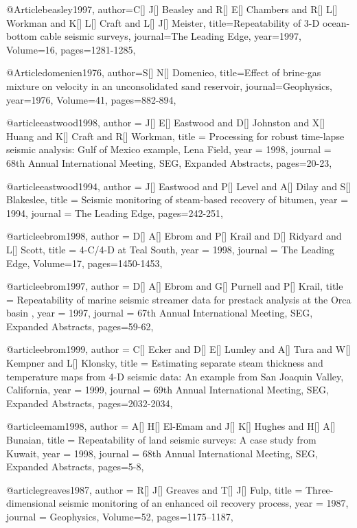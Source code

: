 @Article{beasley1997,
  author={C[] J[] Beasley and R[] E[] Chambers and R[] L[] Workman and K[] L[] Craft and L[] J[] Meister},
  title={Repeatability of 3-D ocean-bottom cable seismic
surveys},
  journal={The Leading Edge},
  year=1997,
  Volume=16,
  pages={1281-1285},
}


@Article{domenien1976,
  author={S[] N[] Domenieo},
  title={Effect of brine-gas mixture on velocity in an
unconsolidated sand reservoir},
  journal={Geophysics},
  year=1976,
  Volume=41,
  pages={882-894},
}

@article{eastwood1998,
  author =	 {J[] E[] Eastwood and D[] Johnston and X[] Huang and K[] Craft and R[] Workman},
  title =	 { Processing for robust time-lapse seismic analysis: Gulf of
Mexico example, Lena Field},
  year =	 1998,
  journal =	 {68th Annual International Meeting, SEG, Expanded Abstracts},
 pages=20-23,
}


@article{eastwood1994,
  author =	 {J[] Eastwood and P[] Level and A[] Dilay and S[] Blakeslee},
  title =	 {Seismic monitoring of steam-based recovery of bitumen},
  year =	 1994,
  journal =	 {The Leading Edge},
 pages=242-251,
}

@article{ebrom1998,
  author =	 {D[] A[] Ebrom and P[] Krail and D[] Ridyard and L[] Scott},
  title =	 {4-C/4-D at Teal South},
  year =	 1998,
  journal =	 {The Leading Edge},
    Volume=17,
 pages=1450-1453,
}

@article{ebrom1997,
  author =	 {D[] A[] Ebrom and G[] Purnell and P[] Krail},
  title =	 { Repeatability of marine seismic streamer data for prestack analysis at the Orca basin },
  year =	 1997,
  journal =	 {67th Annual International Meeting, SEG, Expanded Abstracts},
 pages=59-62,
}

@article{ebrom1999,
  author =	 {C[] Ecker and D[] E[] Lumley and A[] Tura and W[] Kempner and L[] Klonsky},
  title =	 {Estimating separate steam thickness and temperature maps from 4-D seismic data: An example from San Joaquin Valley, California},
  year =	 1999,
  journal =	 {69th Annual International Meeting, SEG, Expanded Abstracts},
 pages=2032-2034,
}

@article{emam1998,
  author =	 {A[] H[] El-Emam and J[] K[] Hughes and H[] A[] Bunaian},
  title =	 {Repeatability of land seismic surveys: A case study from Kuwait},
  year =	 1998,
  journal =	 {68th Annual International Meeting, SEG, Expanded Abstracts},
 pages=5-8,
}


@article{greaves1987,
  author =	 {R[] J[] Greaves and T[] J[] Fulp},
  title =	 {Three-dimensional seismic monitoring of an enhanced oil recovery process},
  year =	 1987,
  journal =	 {Geophysics},
    Volume=52,
 pages=1175–1187,
}

